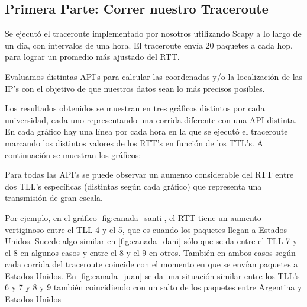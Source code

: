 \subsection{Primera Parte: Correr nuestro Traceroute}

Se ejecutó el traceroute implementado por nosotros utilizando Scapy a lo largo de un día, con intervalos de una hora. El traceroute envía 20 paquetes a cada hop, para lograr un promedio más ajustado del RTT.

Evaluamos distintas API's para calcular las coordenadas y/o la localización de las IP's con el objetivo de que nuestros datos sean lo más precisos posibles.


Los resultados obtenidos se muestran en tres gráficos distintos por cada universidad, cada uno representando una corrida diferente con una API distinta. En cada gráfico hay una línea por cada hora en la que se ejecutó el traceroute marcando los distintos valores de los RTT's en función de los TTL's. A continuación se muestran los gráficos:



 


 

 

Para todas las API's se puede observar un aumento considerable del RTT entre dos TLL's específicas (distintas según cada gráfico) que representa una transmisión de gran escala. 

Por ejemplo, en el gráfico \ref{fig:canada_santi}, el RTT tiene un aumento vertiginoso entre el TLL 4 y el 5, que es cuando los paquetes llegan a Estados Unidos. Sucede algo similar en \ref{fig:canada_dani} sólo que se da entre el TLL 7 y el 8 en algunos casos y entre el 8 y el 9 en otros. También en ambos casos según cada corrida del traceroute coincide con el momento en que se envían paquetes a Estados Unidos. En \ref{fig:canada_juan} se da una situación similar entre los TLL's 6 y 7 y 8 y 9 también coincidiendo con un salto de los paquetes entre Argentina y Estados Unidos

